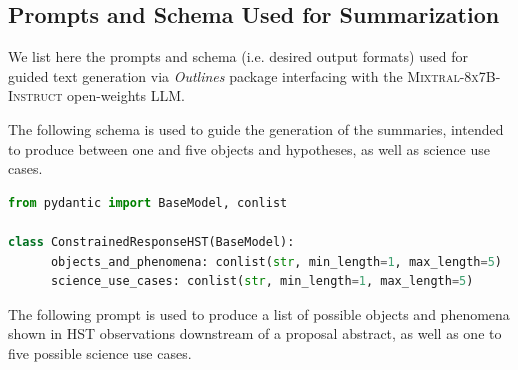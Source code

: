 \documentclass[10pt]{article} %
\newcommand{\package}[1]{\textsl{#1}\xspace}
\begin{document}
\subsection{Prompts and Schema Used for Summarization}
\label{app:summarization}

We list here the prompts and schema (i.e.
%
desired output formats) used for guided text generation via \package{Outlines} package interfacing with the \textsc{Mixtral-8x7B-Instruct} open-weights LLM.

The following schema is used to guide the generation of the summaries, intended to produce between one and five objects and hypotheses, as well as science use cases.

\begin{lstlisting}[language=Python]
from pydantic import BaseModel, conlist

class ConstrainedResponseHST(BaseModel):
      objects_and_phenomena: conlist(str, min_length=1, max_length=5)
      science_use_cases: conlist(str, min_length=1, max_length=5)
\end{lstlisting}

The following prompt is used to produce a list of possible objects and phenomena shown in HST observations downstream of a proposal abstract, as well as one to five possible science use cases.
\end{document}
